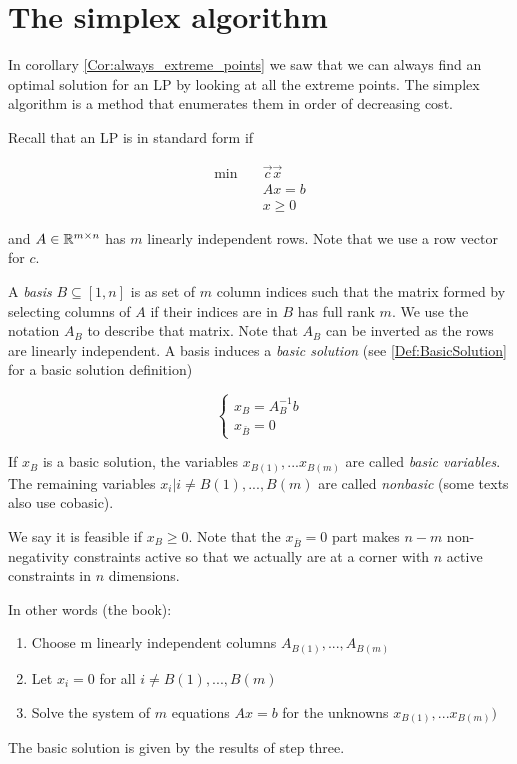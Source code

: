 \section{The simplex algorithm}

In corollary \ref{Cor:always_extreme_points} we saw that we can always find an optimal solution for an LP by looking at all the extreme points. The simplex algorithm is a method that enumerates them in order of decreasing cost. 

Recall that an LP is in standard form if

\begin{align*}
\min \quad & \vec c\vec x\\
&Ax = b\\
&x\geq 0
\end{align*}

and $A\in \mathbb{R}^{m\times n}$ has $m$ linearly independent rows. Note that we use a row vector for $c$.

A \emph{basis} $B\subseteq [1,n]$ is as set of $m$ column indices such that the matrix formed by selecting columns of $A$ if their indices are in $B$ has full rank $m$. We use the notation $A_B$ to describe that matrix. Note that $A_B$ can be inverted as the rows are linearly independent. A basis induces a \emph{basic solution} (see \ref{Def:BasicSolution} for a basic solution definition)

\[\begin{cases} x_B = A^{-1}_Bb\\ x_{\bar B} = 0\end{cases}\]

If $x_B$ is a basic solution, the variables $x_{B(1)},...x_{B(m)}$ are called \emph{basic variables}. The remaining variables $x_i|i \neq B(1),...,B(m)$ are called \emph{nonbasic} (some texts also use cobasic). 

We say it is feasible if $x_B\geq 0$. Note that the $x_{\bar B}=0$ part makes $n-m$ non-negativity constraints active so that we actually are at a corner with $n$ active constraints in $n$ dimensions.

In other words (the book):
\begin{enumerate} 
 \item Choose m linearly independent columns $A_{B(1)},...,A_{B(m)}$
 \item Let $x_i=0$ for all $i \neq B(1),...,B(m)$
 \item Solve the system of $m$ equations $Ax=b$ for the unknowns $x_{B(1)},...x_{B(m)})$
\end{enumerate}
The basic solution is given by the results of step three.

